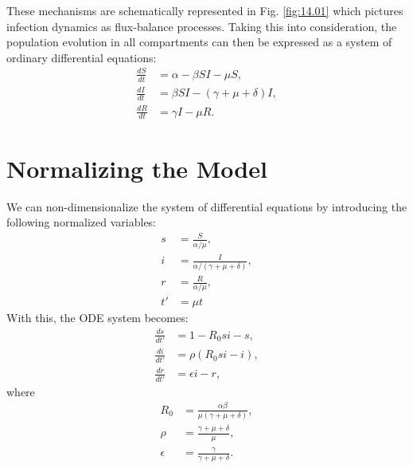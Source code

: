 These mechanisms are schematically represented in Fig. \ref{fig:14.01} which pictures infection dynamics as flux-balance processes. Taking this into consideration, the population evolution in all compartments can then be expressed as a system of ordinary differential equations:
\begin{align*}
\frac{dS}{dt} &= \alpha -\beta SI -\mu S, \\
\frac{dI}{dt} &= \beta SI - (\gamma + \mu + \delta) I, \\
\frac{dR}{dt} &= \gamma I - \mu R.
\end{align*}
\section{Normalizing the Model}

We can non-dimensionalize the system of differential equations by introducing the following normalized variables:
\begin{align*}
s &= \frac{S}{\alpha / \mu}, \\ 
i &= \frac{I}{\alpha / (\gamma + \mu + \delta)}, \\ 
r &= \frac{R}{\alpha / \mu}, \\
t' &= \mu t
\end{align*}
With this, the ODE system becomes:
\begin{align*}
\frac{ds}{dt'} &= 1 - R_0 si - s,\\
\frac{di}{dt'} &= \rho (R_0 si - i),\\
\frac{dr}{dt'} &= \epsilon i - r,
\end{align*}
where 
\begin{align*}
    R_0 &= \frac{\alpha \beta}{\mu(\gamma + \mu + \delta)}, \\
    \rho &= \frac{\gamma + \mu + \delta}{\mu}, \\
    \epsilon &= \frac{\gamma}{\gamma + \mu + \delta}.
\end{align*}

